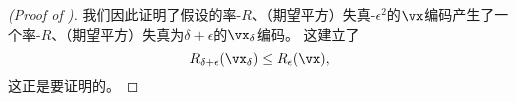 \documentclass[../../book-main_zh.tex]{subfiles}
\begin{document}
\begin{proof}[(Proof of )]
    我们因此证明了假设的率-$R$、（期望平方）失真-$\epsilon^2$的$\vx$编码产生了一个率-$R$、（期望平方）失真为$\delta + \epsilon$的$\vx_{\delta}$编码。
    这建立了
    \begin{equation}
        R_{\delta + \epsilon}(\vx_{\delta})
        \leq
        R_{\epsilon}(\vx),
    \end{equation}
    这正是要证明的。


\end{proof}
\end{document}
